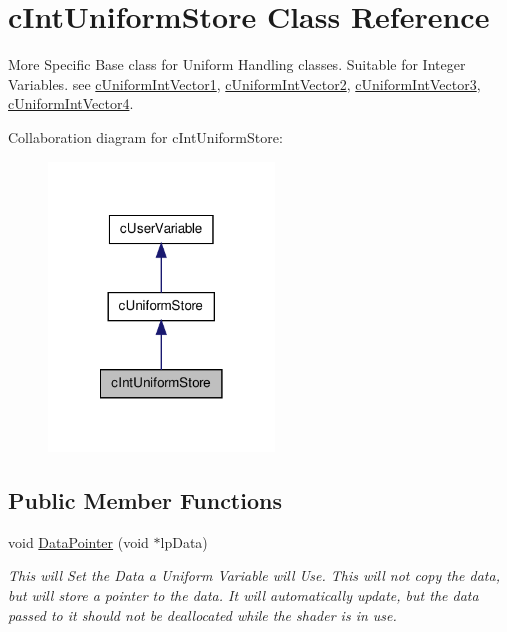 \hypertarget{classc_int_uniform_store}{
\section{cIntUniformStore Class Reference}
\label{classc_int_uniform_store}
}


More Specific Base class for Uniform Handling classes. Suitable for Integer Variables. see \hyperlink{classc_uniform_int_vector1}{cUniformIntVector1}, \hyperlink{classc_uniform_int_vector2}{cUniformIntVector2}, \hyperlink{classc_uniform_int_vector3}{cUniformIntVector3}, \hyperlink{classc_uniform_int_vector4}{cUniformIntVector4}.  




Collaboration diagram for cIntUniformStore:\nopagebreak
\begin{figure}[H]
\begin{center}
\leavevmode
\includegraphics[width=170pt]{classc_int_uniform_store__coll__graph}
\end{center}
\end{figure}
\subsection*{Public Member Functions}
\begin{DoxyCompactItemize}
\item 
\hypertarget{classc_int_uniform_store_a1a55824498ebea1af11f4e89c8868e77}{
void \hyperlink{classc_int_uniform_store_a1a55824498ebea1af11f4e89c8868e77}{DataPointer} (void $\ast$lpData)}
\label{classc_int_uniform_store_a1a55824498ebea1af11f4e89c8868e77}

\begin{DoxyCompactList}\small\item\em This will Set the Data a Uniform Variable will Use. This will not copy the data, but will store a pointer to the data. It will automatically update, but the data passed to it should not be deallocated while the shader is in use. \end{DoxyCompactList}\end{DoxyCompactItemize}


